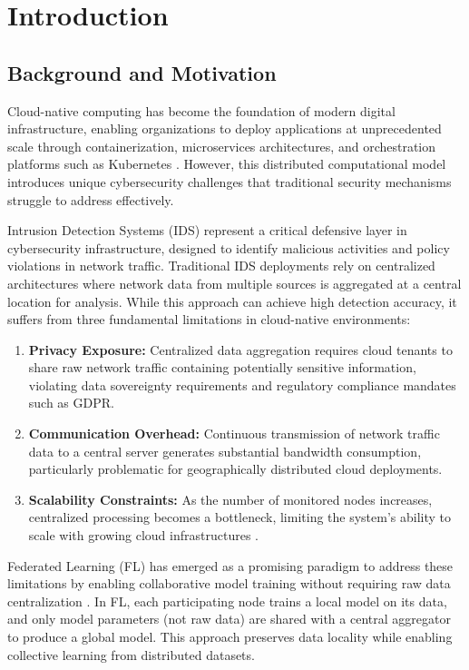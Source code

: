 \section{Introduction}
\label{sec:introduction}

\subsection{Background and Motivation}

Cloud-native computing has become the foundation of modern digital infrastructure, enabling organizations to deploy applications at unprecedented scale through containerization, microservices architectures, and orchestration platforms such as Kubernetes \citep{veeravalli2025ai}. However, this distributed computational model introduces unique cybersecurity challenges that traditional security mechanisms struggle to address effectively.

Intrusion Detection Systems (IDS) represent a critical defensive layer in cybersecurity infrastructure, designed to identify malicious activities and policy violations in network traffic. Traditional IDS deployments rely on centralized architectures where network data from multiple sources is aggregated at a central location for analysis. While this approach can achieve high detection accuracy, it suffers from three fundamental limitations in cloud-native environments:

\begin{enumerate}
    \item \textbf{Privacy Exposure:} Centralized data aggregation requires cloud tenants to share raw network traffic containing potentially sensitive information, violating data sovereignty requirements and regulatory compliance mandates such as GDPR.
    
    \item \textbf{Communication Overhead:} Continuous transmission of network traffic data to a central server generates substantial bandwidth consumption, particularly problematic for geographically distributed cloud deployments.
    
    \item \textbf{Scalability Constraints:} As the number of monitored nodes increases, centralized processing becomes a bottleneck, limiting the system's ability to scale with growing cloud infrastructures \citep{sharma2025multi}.
\end{enumerate}

Federated Learning (FL) has emerged as a promising paradigm to address these limitations by enabling collaborative model training without requiring raw data centralization \citep{albshaier2025federated}. In FL, each participating node trains a local model on its data, and only model parameters (not raw data) are shared with a central aggregator to produce a global model. This approach preserves data locality while enabling collective learning from distributed datasets.


